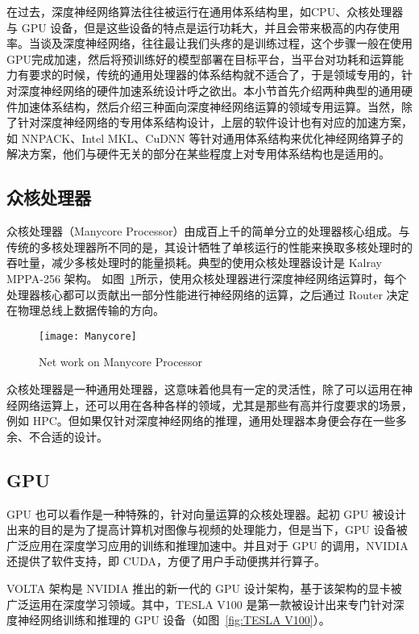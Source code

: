 在过去，深度神经网络算法往往被运行在通用体系结构里，如CPU、众核处理器与 GPU 设备，但是这些设备的特点是运行功耗大，并且会带来极高的内存使用率。当谈及深度神经网络，往往最让我们头疼的是训练过程，这个步骤一般在使用GPU完成加速，然后将预训练好的模型部署在目标平台，当平台对功耗和运算能力有要求的时候，传统的通用处理器的体系结构就不适合了，于是领域专用的，针对深度神经网络的硬件加速系统设计呼之欲出。本小节首先介绍两种典型的通用硬件加速体系结构，然后介绍三种面向深度神经网络运算的领域专用运算。当然，除了针对深度神经网络的专用体系结构设计，上层的软件设计也有对应的加速方案，如 NNPACK、Intel MKL、CuDNN 等针对通用体系结构来优化神经网络算子的解决方案，他们与硬件无关的部分在某些程度上对专用体系结构也是适用的。

\subsection{众核处理器}

众核处理器（Manycore Processor）由成百上千的简单分立的处理器核心组成。与传统的多核处理器所不同的是，其设计牺牲了单核运行的性能来换取多核处理时的吞吐量，减少多核处理时的能量损耗。典型的使用众核处理器设计是 Kalray MPPA-256 架构。
如图~\ref{fig:Manycore}所示，使用众核处理器进行深度神经网络运算时，每个处理器核心都可以贡献出一部分性能进行神经网络的运算，之后通过 Router 决定在物理总线上数据传输的方向。

\begin{figure}[!htbp]
    \centering
    \texttt{[image: Manycore]}
    \caption{Net work on Manycore Processor}
    \label{fig:Manycore}
\end{figure}

众核处理器是一种通用处理器，这意味着他具有一定的灵活性，除了可以运用在神经网络运算上，还可以用在各种各样的领域，尤其是那些有高并行度要求的场景，例如 HPC。但如果仅针对深度神经网络的推理，通用处理器本身便会存在一些多余、不合适的设计。 

\subsection{GPU}

GPU 也可以看作是一种特殊的，针对向量运算的众核处理器。起初 GPU 被设计出来的目的是为了提高计算机对图像与视频的处理能力，但是当下，GPU 设备被广泛应用在深度学习应用的训练和推理加速中。并且对于 GPU 的调用，NVIDIA 还提供了软件支持，即 CUDA，方便了用户手动便携并行算子。

VOLTA 架构是 NVIDIA 推出的新一代的 GPU 设计架构，基于该架构的显卡被广泛运用在深度学习领域。其中，TESLA V100 是第一款被设计出来专门针对深度神经网络训练和推理的 GPU 设备（如图~\ref{fig:TESLA V100}）。

